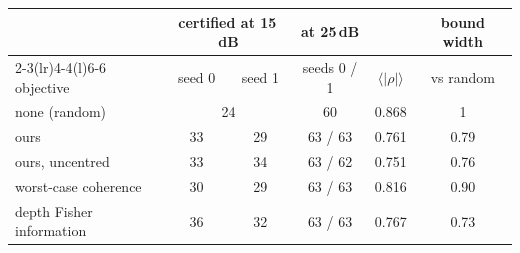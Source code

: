 \begin{tabular}{@{}l cc c cc@{}}\toprule
 & \multicolumn{2}{c}{certified at 15\,dB} & at 25\,dB & & bound width\\
\cmidrule(lr){2-3}\cmidrule(lr){4-4}\cmidrule(l){6-6}
objective & seed 0 & seed 1 & seeds 0 / 1 & $\langle|\rho|\rangle$ & vs random\\\midrule
none (random) & \multicolumn{2}{c}{24} & 60 & 0.868 & 1\\
ours & 33 & 29 & 63 / 63 & 0.761 & 0.79\\
ours, uncentred & 33 & 34 & 63 / 62 & 0.751 & 0.76\\
worst-case coherence & 30 & 29 & 63 / 63 & 0.816 & 0.90\\
depth Fisher information & 36 & 32 & 63 / 63 & 0.767 & 0.73\\
\bottomrule\end{tabular}
